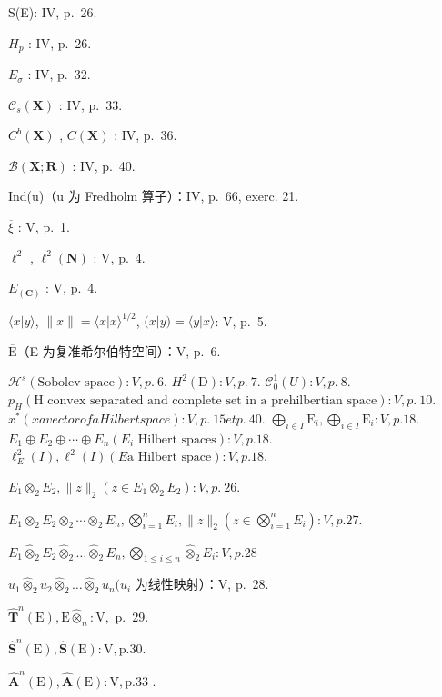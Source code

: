 S(E): IV, p.~26.

\(H_{p}\) : IV, p.~26.

\(E_{\sigma}\) : IV, p.~32.

\(\mathcal{C}_{s}(\mathbf{X})\) : IV, p.~33.

\(C^{b}(\mathbf{X})\) , \(C(\mathbf{X})\) : IV, p.~36.

\(\mathcal{B}(\mathbf{X};\mathbf{R})\) : IV, p.~40.

Ind(u)（u 为 Fredholm 算子）：IV, p.~66, exerc. 21.

\(\overline{\xi}\) : V, p.~1.

\(\ell^{2}\) , \(\ell^{2}(\mathbf{N})\) : V, p.~4.

\(E_{(\mathbf{C})}\) : V, p.~4.

\(\langle x|y\rangle\), \(\|x\| = \langle x|x\rangle^{1/2}\), \((x|y) = \langle y|x\rangle\): V, p.~5.

\(\overline{\mathrm{E}}\)（E 为复准希尔伯特空间）：V, p.~6.

\(\mathcal{H}^{s} (\text {Sobolev space}): V, p.~6.\) \(H^{2}(\text {D}): V, p.~7.\) \(\mathcal{C}_{0}^{1}(U): V, p.~8.\) \(p_{H} (\text {H convex separated and complete set in a prehilbertian space}): V, p.~10.\) \(x^{*} (x a vector of a Hilbert space): V, p.~15 et p.~40.\) \(\bigoplus_{i\in I}\mathrm{E}_{i},\bigoplus_{i\in I}\mathrm{E}_{i}:V,p.18.\) \(E_{1}\oplus E_{2}\oplus\cdots\oplus E_{n} (E_{i}\text { Hilbert spaces}):V,p.18.\) \(\ell_{E}^{2}(I),\ell^{2}(I)(E\text {a Hilbert space}):V,p.18.\)

\(E_{1} \otimes_{2} E_{2}, \|z\|_{2} (z \in E_{1} \otimes_{2} E_{2}) : V, p.~26.\)

\(E_{1} \otimes_{2} E_{2} \otimes_{2} \cdots \otimes_{2} E_{n}, \bigotimes_{i=1}^{n} E_{i}, \|z\|_{2} \left( z \in \bigotimes_{i=1}^{n} E_{i} \right) : V, p. 27.\)

\(E_{1} \hat{\otimes}_{2} E_{2} \hat{\otimes}_{2} \ldots \hat{\otimes}_{2} E_{n}, \bigotimes_{1 \leqslant i \leqslant n} \hat{\otimes}_{2} E_{i}: V, p. 28\)

\(u_{1}\hat{\otimes}_{2}u_{2}\hat{\otimes}_{2}\ldots \hat{\otimes}_{2}u_{n}(u_{i}\) 为线性映射）：V, p.~28.

\(\hat{\mathbf{T}}^n (\mathrm{E}),\mathrm{E}\hat{\otimes}_n:\mathrm{V},\) p.~29.

\(\hat{\mathbf{S}}^{n}(\mathrm{E}), \hat{\mathbf{S}}(\mathrm{E}) : \mathrm{V}, \mathrm{p.} 30.\)

\(\hat{\mathbf{A}}^{n}(\mathrm{E}), \hat{\mathbf{A}}(\mathrm{E}) : \mathrm{V}, \mathrm{p. 33}\) .


